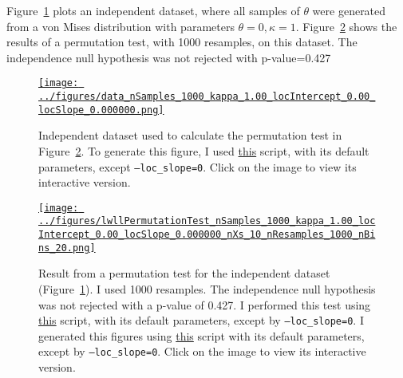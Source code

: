 \documentclass[12pt]{article}
\begin{document}
Figure~\ref{fig:data_independent} plots an independent dataset, where all
samples of $\theta$ were generated from a von Mises distribution with
parameters $\theta=0, \kappa=1$.  Figure~\ref{fig:perm_test_independent_data}
shows the results of a permutation test, with 1000 resamples, on this dataset.
The independence null hypothesis was not rejected with p-value=0.427

\begin{figure}
    \begin{center}
        \href{https://www.gatsby.ucl.ac.uk/~rapela/neuroinformatics/2023/ws4/figures/data_nSamples_1000_kappa_1.00_locIntercept_0.00_locSlope_0.000000.html}{\texttt{[image: ../figures/data\_nSamples\_1000\_kappa\_1.00\_locIntercept\_0.00\_locSlope\_0.000000.png]}}

        \caption{Independent dataset used to calculate the permutation test in
        Figure~\ref{fig:perm_test_independent_data}.  To generate this figure,
        I used
        \href{https://github.com/joacorapela/neuroinformatics23/blob/master/worksheets/ws4/mySolution/code/scripts/doPlotSampledData.py}{this}
        script, with its default parameters, except \texttt{--loc\_slope=0}.
        Click on the image to view its interactive version.}

        \label{fig:data_independent}

    \end{center}
\end{figure}

\begin{figure}
    \begin{center}
        \href{https://www.gatsby.ucl.ac.uk/~rapela/neuroinformatics/2023/ws4/figures/lwllPermutationTest_nSamples_1000_kappa_1.00_locIntercept_0.00_locSlope_0.000000_nXs_10_nResamples_1000_nBins_20.html}{\texttt{[image: ../figures/lwllPermutationTest\_nSamples\_1000\_kappa\_1.00\_locIntercept\_0.00\_locSlope\_0.000000\_nXs\_10\_nResamples\_1000\_nBins\_20.png]}}

        \caption{Result from a permutation test for the independent dataset
        (Figure~\ref{fig:data_independent}).  I
        used 1000 resamples. The independence null hypothesis was not rejected
        with a p-value of 0.427. I performed this test using
        \href{https://github.com/joacorapela/neuroinformatics23/blob/master/worksheets/ws4/mySolution/code/scripts/doPermutationTestLWLL.py}{this}
        script, with its default parameters, except by \texttt{--loc\_slope=0}.
        I generated this figures using
        \href{https://github.com/joacorapela/neuroinformatics23/blob/master/worksheets/ws4/mySolution/code/scripts/doPlotPermutationTestResult.py}{this}
        script with its default parameters, except by \texttt{--loc\_slope=0}.
        Click on the image to view its interactive version.}

        \label{fig:perm_test_independent_data}

    \end{center}
\end{figure}
\end{document}
